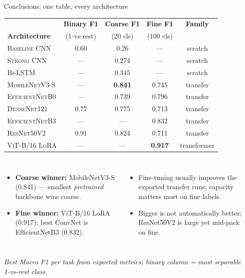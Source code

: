 \documentclass[aspectratio=169,11pt]{beamer}
\newcommand{\best}[1]{\textcolor{piraeusaccent}{\textbf{#1}}} %
\newcommand{\arch}[1]{\textsc{#1}}
\newcommand{\source}[1]{{\footnotesize\itshape\textcolor{softgrey}{#1}}}
\begin{document}
\begin{frame}{Conclusions: one table, every architecture}
  \centering
  \footnotesize
  \renewcommand{\arraystretch}{0.9}
  \setlength{\tabcolsep}{4pt}
  \begin{tabular}{@{}lcccc@{}}
    \toprule
     & \textbf{Binary F1} & \textbf{Coarse F1} & \textbf{Fine F1} & \textbf{Family} \\
    \textbf{Architecture} & {\footnotesize(1-vs-rest)} & {\footnotesize(20 cls)} & {\footnotesize(100 cls)} & {} \\
    \midrule
    \arch{Baseline CNN}    & 0.60 & 0.26          & ---           & scratch  \\
    \arch{Strong CNN}      & ---  & 0.274         & ---           & scratch  \\
    \arch{Bi-LSTM}         & ---  & 0.345         & ---           & scratch  \\
    \arch{MobileNetV3-S}   & ---  & \best{0.841}  & 0.745         & transfer  \\
    \arch{EfficientNetB0}  & ---  & 0.739         & 0.796         & transfer  \\
    \arch{DenseNet121}     & 0.77 & 0.775         & 0.713         & transfer  \\
    \arch{EfficientNetB3}  & ---  & ---           & 0.832         & transfer \\
    \arch{ResNet50V2}      & 0.91 & 0.824         & 0.711         & transfer \\
    \arch{ViT-B/16 LoRA}   & ---  & ---           & \best{0.917}  & transformer \\
    \bottomrule
  \end{tabular}

  \vspace{0.15em}    %
  \begin{columns}[T,onlytextwidth]
      \begin{itemize}
        \item \textbf{Coarse winner:} MobileNetV3-S (0.841) --- smallest \emph{pretrained} backbone wins coarse.
        \item \textbf{Fine winner:} ViT-B/16 LoRA (0.917); best ConvNet is EfficientNetB3 (0.832).
      \end{itemize}
      \begin{itemize}
        \item Fine-tuning usually improves the exported transfer runs; capacity matters most on fine labels.
        \item Bigger is not automatically better; ResNet50V2 is large yet mid-pack on fine.
      \end{itemize}
  \end{columns}
  \vspace{0.05em}    %
  \source{Best Macro F1 per task from exported metrics; binary column = most separable 1-vs-rest class.}
\end{frame}
\end{document}
